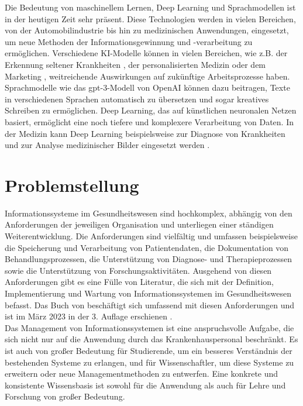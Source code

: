 Die Bedeutung von maschinellem Lernen, Deep Learning und Sprachmodellen ist in der heutigen Zeit sehr präsent. 
Diese Technologien werden in vielen Bereichen, von der Automobilindustrie bis hin zu medizinischen Anwendungen, eingesetzt, um neue Methoden der Informationsgewinnung und -verarbeitung zu ermöglichen. 
Verschiedene KI-Modelle können in vielen Bereichen, wie z.B. der Erkennung seltener Krankheiten \citep{rare_diseases}, der personalisierten Medizin \citep{precision_med} oder dem Marketing \citep{ai_marketing}, weitreichende Auswirkungen auf zukünftige Arbeitsprozesse haben.
Sprachmodelle wie das \ac{gpt}-3-Modell von OpenAI \citep{gpt3} können dazu beitragen, Texte in verschiedenen Sprachen automatisch zu übersetzen und sogar kreatives Schreiben zu ermöglichen. 
Deep Learning, das auf künstlichen neuronalen Netzen basiert, ermöglicht eine noch tiefere und komplexere Verarbeitung von Daten. 
In der Medizin kann Deep Learning beispielsweise zur Diagnose von Krankheiten und zur Analyse medizinischer Bilder eingesetzt werden \citep{skincancer}.

\section{Problemstellung}\label{sec:problemstellung}
Informationssysteme im Gesundheitswesen sind hochkomplex, abhängig von den Anforderungen der jeweiligen Organisation und unterliegen einer ständigen Weiterentwicklung.
Die Anforderungen sind vielfältig und umfassen beispielsweise die Speicherung und Verarbeitung von Patientendaten, die Dokumentation von Behandlungsprozessen, die Unterstützung von Diagnose- und Therapieprozessen sowie die Unterstützung von Forschungsaktivitäten.
Ausgehend von diesen Anforderungen gibt es eine Fülle von Literatur, die sich mit der Definition, Implementierung und Wartung von Informationssystemen im Gesundheitswesen befasst. 
Das Buch  von \citeauthor{bb} beschäftigt sich umfassend mit diesen Anforderungen und ist im März 2023 in der 3. Auflage erschienen \citep{bb}.\\

Das Management von Informationssystemen ist eine anspruchsvolle Aufgabe, die sich nicht nur auf die Anwendung durch das Krankenhauspersonal beschränkt.
Es ist auch von großer Bedeutung für Studierende, um ein besseres Verständnis der bestehenden Systeme zu erlangen, und für Wissenschaftler, um diese Systeme zu erweitern oder neue Managementmethoden zu entwerfen.
Eine konkrete und konsistente Wissensbasis ist sowohl für die Anwendung als auch für Lehre und Forschung von großer Bedeutung.\\

